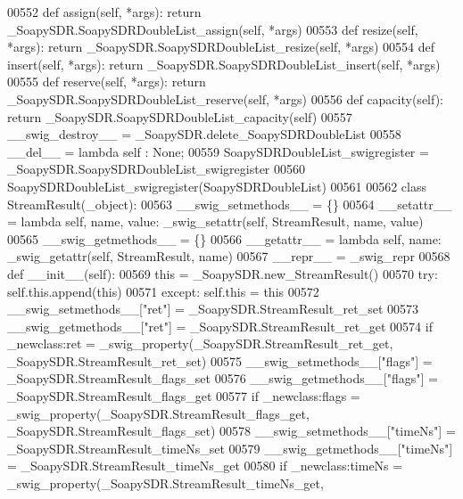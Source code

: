 \begin{DoxyCode}
{{{{00552     \textcolor{keyword}{def }assign(self, *args): \textcolor{keywordflow}{return} \_SoapySDR.SoapySDRDoubleList\_assign(self, *args)
00553     \textcolor{keyword}{def }resize(self, *args): \textcolor{keywordflow}{return} \_SoapySDR.SoapySDRDoubleList\_resize(self, *args)
00554     \textcolor{keyword}{def }insert(self, *args): \textcolor{keywordflow}{return} \_SoapySDR.SoapySDRDoubleList\_insert(self, *args)
00555     \textcolor{keyword}{def }reserve(self, *args): \textcolor{keywordflow}{return} \_SoapySDR.SoapySDRDoubleList\_reserve(self, *args)
00556     \textcolor{keyword}{def }capacity(self): \textcolor{keywordflow}{return} \_SoapySDR.SoapySDRDoubleList\_capacity(self)
00557     \_\_swig\_destroy\_\_ = \_SoapySDR.delete\_SoapySDRDoubleList
00558     \_\_del\_\_ = \textcolor{keyword}{lambda} self : \textcolor{keywordtype}{None};
00559 SoapySDRDoubleList\_swigregister = \_SoapySDR.SoapySDRDoubleList\_swigregister
00560 SoapySDRDoubleList_swigregister(SoapySDRDoubleList)
00561 
00562 \textcolor{keyword}{class }StreamResult(_object):
00563     \_\_swig\_setmethods\_\_ = \{\}
00564     \_\_setattr\_\_ = \textcolor{keyword}{lambda} self, name, value: _swig_setattr(self, StreamResult, name, value)
00565     \_\_swig\_getmethods\_\_ = \{\}
00566     \_\_getattr\_\_ = \textcolor{keyword}{lambda} self, name: _swig_getattr(self, StreamResult, name)
00567     \_\_repr\_\_ = \_swig\_repr
00568     \textcolor{keyword}{def }__init__(self): 
00569         this = \_SoapySDR.new\_StreamResult()
00570         \textcolor{keywordflow}{try}: self.this.append(this)
00571         \textcolor{keywordflow}{except}: self.this = this
00572     \_\_swig\_setmethods\_\_[\textcolor{stringliteral}{"ret"}] = \_SoapySDR.StreamResult\_ret\_set
00573     \_\_swig\_getmethods\_\_[\textcolor{stringliteral}{"ret"}] = \_SoapySDR.StreamResult\_ret\_get
00574     \textcolor{keywordflow}{if} \_newclass:ret = _swig_property(\_SoapySDR.StreamResult\_ret\_get, \_SoapySDR.StreamResult\_ret\_set)
00575     \_\_swig\_setmethods\_\_[\textcolor{stringliteral}{"flags"}] = \_SoapySDR.StreamResult\_flags\_set
00576     \_\_swig\_getmethods\_\_[\textcolor{stringliteral}{"flags"}] = \_SoapySDR.StreamResult\_flags\_get
00577     \textcolor{keywordflow}{if} \_newclass:flags = _swig_property(\_SoapySDR.StreamResult\_flags\_get, \_SoapySDR.StreamResult\_flags\_set)
00578     \_\_swig\_setmethods\_\_[\textcolor{stringliteral}{"timeNs"}] = \_SoapySDR.StreamResult\_timeNs\_set
00579     \_\_swig\_getmethods\_\_[\textcolor{stringliteral}{"timeNs"}] = \_SoapySDR.StreamResult\_timeNs\_get
00580     \textcolor{keywordflow}{if} \_newclass:timeNs = _swig_property(\_SoapySDR.StreamResult\_timeNs\_get, 
}}}}
\end{DoxyCode}
